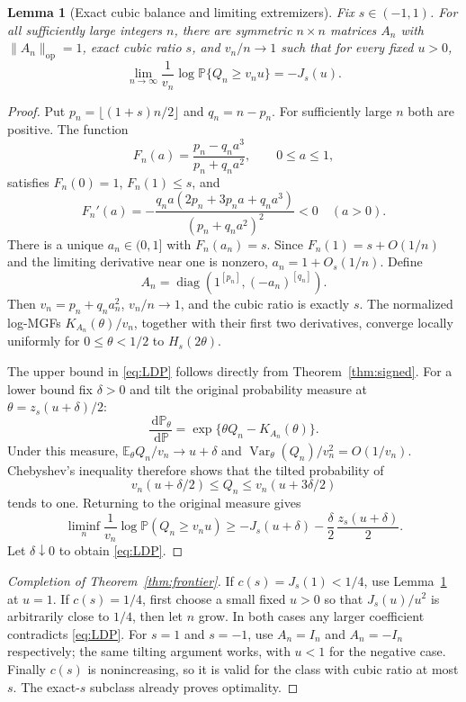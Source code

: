 \documentclass[11pt,letterpaper]{article}
\numberwithin{equation}{section}
\newtheorem{lemma}[theorem]{Lemma}
\theoremstyle{definition}\newtheorem{definition}[theorem]{Definition}
\theoremstyle{remark}\newtheorem{remark}[theorem]{Remark}
\newcommand{\E}{\mathbb E}
\newcommand{\PP}{\mathbb P}
\newcommand{\diag}{\operatorname{diag}}
\newcommand{\op}{\mathrm{op}}
\newcommand{\Var}{\operatorname{Var}}
\newcommand{\dd}{\,\mathrm d}
\begin{document}
\begin{lemma}[Exact cubic balance and limiting extremizers]
\label{lem:extremizers}
Fix $s\in(-1,1)$. For all sufficiently large integers $n$, there
are symmetric $n\times n$ matrices $A_n$ with
$\|A_n\|_{\op}=1$, exact cubic ratio $s$, and $v_n/n\to1$ such that
for every fixed $u>0$,
\begin{equation}\label{eq:LDP}
 \lim_{n\to\infty}\frac1{v_n}\log
 \PP\{Q_n\ge v_nu\}=-J_s(u).
\end{equation}
\end{lemma}
\begin{proof}
Put $p_n=\lfloor(1+s)n/2\rfloor$ and $q_n=n-p_n$. For sufficiently
large $n$ both are positive. The function
\[
 F_n(a)=\frac{p_n-q_na^3}{p_n+q_na^2},\qquad 0\le a\le1,
\]
satisfies $F_n(0)=1$, $F_n(1)\le s$, and
\[
 F_n'(a)=-\frac{q_na(2p_n+3p_na+q_na^3)}{(p_n+q_na^2)^2}<0
 \quad(a>0).
\]
There is a unique $a_n\in(0,1]$ with $F_n(a_n)=s$.
Since $F_n(1)=s+O(1/n)$ and the limiting derivative near one is
nonzero, $a_n=1+O_s(1/n)$. Define
\[
 A_n=\diag(1^{[p_n]},(-a_n)^{[q_n]}).
\]
Then $v_n=p_n+q_na_n^2$, $v_n/n\to1$, and the cubic ratio is
exactly $s$. The normalized log-MGFs $K_{A_n}(\theta)/v_n$, together
with their first two derivatives, converge locally uniformly for
$0\le\theta<1/2$ to $H_s(2\theta)$.

The upper bound in \eqref{eq:LDP} follows directly from
Theorem~\ref{thm:signed}. For a lower bound fix $\delta>0$ and tilt
the original probability measure at
$\theta=z_s(u+\delta)/2$:
\[
 \frac{\dd\PP_\theta}{\dd\PP}
 =\exp\{\theta Q_n-K_{A_n}(\theta)\}.
\]
Under this measure,
$\E_\theta Q_n/v_n\to u+\delta$ and
$\Var_\theta(Q_n)/v_n^2=O(1/v_n)$. Chebyshev's inequality therefore
shows that the tilted probability of
\[
 v_n(u+\delta/2)\le Q_n\le v_n(u+3\delta/2)
\]
tends to one. Returning to the original measure gives
\[
 \liminf_n\frac1{v_n}\log\PP(Q_n\ge v_nu)
 \ge -J_s(u+\delta)-\frac\delta2\,\frac{z_s(u+\delta)}2.
\]
Let $\delta\downarrow0$ to obtain \eqref{eq:LDP}.
\end{proof}

\begin{proof}[Completion of Theorem~\ref{thm:frontier}]
If $c(s)=J_s(1)<1/4$, use Lemma~\ref{lem:extremizers} at $u=1$.
If $c(s)=1/4$, first choose a small fixed $u>0$ so that
$J_s(u)/u^2$ is arbitrarily close to $1/4$, then let $n$ grow.
In both cases any larger coefficient contradicts \eqref{eq:LDP}.
For $s=1$ and $s=-1$, use $A_n=I_n$ and $A_n=-I_n$ respectively;
the same tilting argument works, with $u<1$ for the negative case.
Finally $c(s)$ is nonincreasing, so it is valid for the class with
cubic ratio at most $s$. The exact-$s$ subclass already proves optimality.
\end{proof}
\end{document}
